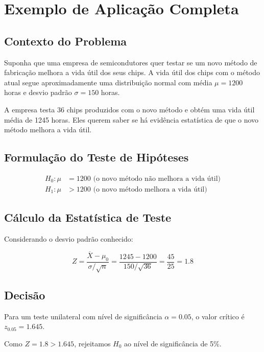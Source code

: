 \documentclass[a4paper,12pt]{article}
\begin{document}
\section{Exemplo de Aplicação Completa}

\subsection{Contexto do Problema}

Suponha que uma empresa de semicondutores quer testar se um novo método de fabricação melhora a vida útil dos seus chips. A vida útil dos chips com o método atual segue aproximadamente uma distribuição normal com média $\mu = 1200$ horas e desvio padrão $\sigma = 150$ horas. 

A empresa testa 36 chips produzidos com o novo método e obtém uma vida útil média de 1245 horas. Eles querem saber se há evidência estatística de que o novo método melhora a vida útil.

\subsection{Formulação do Teste de Hipóteses}

\begin{align}
H_0: \mu &= 1200 \text{ (o novo método não melhora a vida útil)} \\
H_1: \mu &> 1200 \text{ (o novo método melhora a vida útil)}
\end{align}

\subsection{Cálculo da Estatística de Teste}

Considerando o desvio padrão conhecido:

\begin{equation}
Z = \frac{\overline{X} - \mu_0}{\sigma/\sqrt{n}} = \frac{1245 - 1200}{150/\sqrt{36}} = \frac{45}{25} = 1.8
\end{equation}

\subsection{Decisão}

Para um teste unilateral com nível de significância $\alpha = 0.05$, o valor crítico é $z_{0.05} = 1.645$.

Como $Z = 1.8 > 1.645$, rejeitamos $H_0$ ao nível de significância de 5\%.
\end{document}
